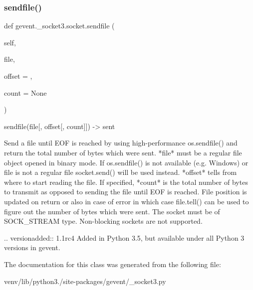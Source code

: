 \subsubsection{\texorpdfstring{sendfile()}{sendfile()}}
{\footnotesize\ttfamily def gevent.\+\_\+socket3.\+socket.\+sendfile (\begin{DoxyParamCaption}\item[{}]{self,  }\item[{}]{file,  }\item[{}]{offset = {},  }\item[{}]{count = {\ttfamily None} }\end{DoxyParamCaption})}

\begin{DoxyVerb}sendfile(file[, offset[, count]]) -> sent

Send a file until EOF is reached by using high-performance
os.sendfile() and return the total number of bytes which
were sent.
*file* must be a regular file object opened in binary mode.
If os.sendfile() is not available (e.g. Windows) or file is
not a regular file socket.send() will be used instead.
*offset* tells from where to start reading the file.
If specified, *count* is the total number of bytes to transmit
as opposed to sending the file until EOF is reached.
File position is updated on return or also in case of error in
which case file.tell() can be used to figure out the number of
bytes which were sent.
The socket must be of SOCK_STREAM type.
Non-blocking sockets are not supported.

.. versionadded:: 1.1rc4
   Added in Python 3.5, but available under all Python 3 versions in
   gevent.
\end{DoxyVerb}
 

The documentation for this class was generated from the following file\+:\begin{DoxyCompactItemize}
\item 
venv/lib/python3./site-\/packages/gevent/\+\_\+socket3.\+py\end{DoxyCompactItemize}
